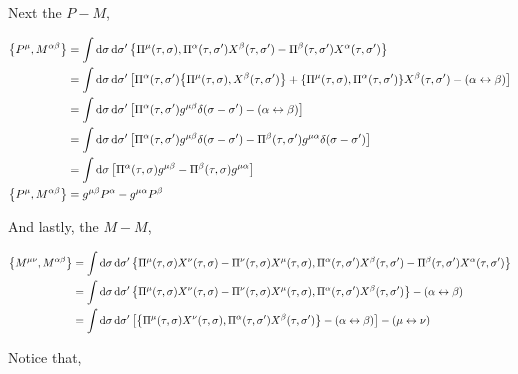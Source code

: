 Next the $P-M$,

\begin{align*}
    \acomm{P^\mu}{M^{\alpha\beta}}&=\int\dd{\sigma}\dd{\sigma'}\acomm{\Pi^\mu\qty(\tau,\sigma)}{\Pi^\alpha\qty(\tau,\sigma')X^\beta\qty(\tau,\sigma')-\Pi^\beta\qty(\tau,\sigma')X^\alpha\qty(\tau,\sigma')}\\
    &=\int\dd{\sigma}\dd{\sigma'}\qty[\Pi^\alpha\qty(\tau,\sigma')\acomm{\Pi^\mu\qty(\tau,\sigma)}{X^\beta\qty(\tau,\sigma')}+\acomm{\Pi^\mu\qty(\tau,\sigma)}{\Pi^\alpha\qty(\tau,\sigma')}X^\beta\qty(\tau,\sigma')-\qty(\alpha\leftrightarrow\beta)]\\
    &=\int\dd{\sigma}\dd{\sigma'}\qty[\Pi^\alpha\qty(\tau,\sigma')g^{\mu\beta}\delta\qty(\sigma-\sigma')-\qty(\alpha\leftrightarrow\beta)]\\
    &=\int\dd{\sigma}\dd{\sigma'}\qty[\Pi^\alpha\qty(\tau,\sigma')g^{\mu\beta}\delta\qty(\sigma-\sigma')-\Pi^\beta\qty(\tau,\sigma')g^{\mu\alpha}\delta\qty(\sigma-\sigma')]\\
    &=\int\dd{\sigma}\qty[\Pi^\alpha\qty(\tau,\sigma)g^{\mu\beta}-\Pi^\beta\qty(\tau,\sigma)g^{\mu\alpha}]\\
    \acomm{P^\mu}{M^{\alpha\beta}}&=g^{\mu\beta}P^\alpha -g^{\mu\alpha}P^\beta 
\end{align*}

And lastly, the $M-M$,

\begin{align*}
    \acomm{M^{\mu\nu}}{M^{\alpha\beta}}&=\int\dd{\sigma}\dd{\sigma'}\acomm{\Pi^\mu\qty(\tau,\sigma)X^\nu\qty(\tau,\sigma)-\Pi^\nu\qty(\tau,\sigma)X^\mu\qty(\tau,\sigma)}{\Pi^\alpha\qty(\tau,\sigma')X^\beta\qty(\tau,\sigma')-\Pi^\beta\qty(\tau,\sigma')X^\alpha\qty(\tau,\sigma')}\\
    &=\int\dd{\sigma}\dd{\sigma'}\acomm{\Pi^\mu\qty(\tau,\sigma)X^\nu\qty(\tau,\sigma)-\Pi^\nu\qty(\tau,\sigma)X^\mu\qty(\tau,\sigma)}{\Pi^\alpha\qty(\tau,\sigma')X^\beta\qty(\tau,\sigma')}-\qty(\alpha\leftrightarrow\beta)\\
    &=\int\dd{\sigma}\dd{\sigma'}\qty[\acomm{\Pi^\mu\qty(\tau,\sigma)X^\nu\qty(\tau,\sigma)}{\Pi^\alpha\qty(\tau,\sigma')X^\beta\qty(\tau,\sigma')}-\qty(\alpha\leftrightarrow\beta)]-\qty(\mu\leftrightarrow\nu)
\end{align*}

Notice that,

